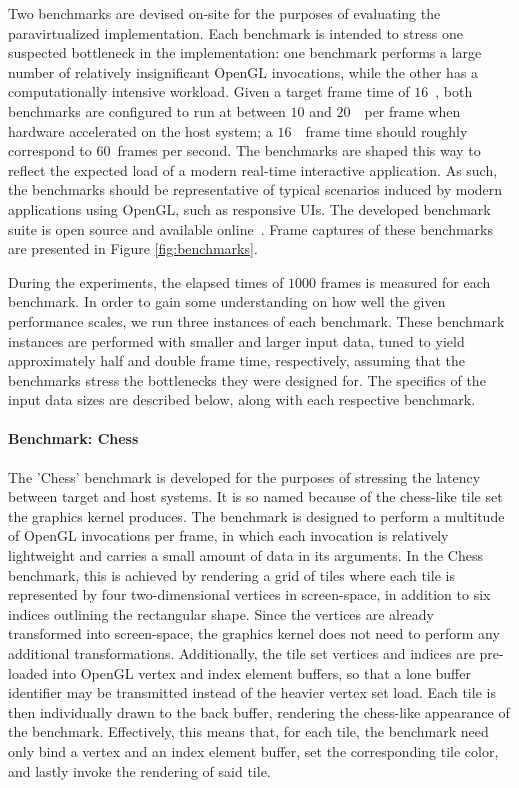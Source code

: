 \documentclass{article}
\newcommand{\masccite}[2][]{\cite{#2}}
\begin{document}
Two benchmarks are devised on-site for the purposes of evaluating the paravirtualized implementation.
Each benchmark is intended to stress one suspected bottleneck in the implementation: one benchmark performs a large number of relatively insignificant OpenGL invocations, while the other has a computationally intensive workload.
Given a target frame time of $16$~\milli\second , both benchmarks are configured to run at between $10$ and $20$~\milli\second\ per frame when hardware accelerated on the host system; a $16$~\milli\second\ frame time should roughly correspond to $60$~frames per second.
The benchmarks are shaped this way to reflect the expected load of a modern real-time interactive application.
As such, the benchmarks should be representative of typical scenarios induced by modern applications using OpenGL, such as responsive UIs.
The developed benchmark suite is open source and available online~\masccite{web:intel:2014}.
Frame captures of these benchmarks are presented in Figure \ref{fig:benchmarks}.

During the experiments, the elapsed times of $1000$ frames is measured for each benchmark.
In order to gain some understanding on how well the given performance scales, we run three instances of each benchmark.
These benchmark instances are performed with smaller and larger input data, tuned to yield approximately half and double frame time, respectively, assuming that the benchmarks stress the bottlenecks they were designed for.
The specifics of the input data sizes are described below, along with each respective benchmark.

\paragraph{Benchmark: Chess}
\label{par:experimentalmethodology_benchmarking_benchmarkchess}
The 'Chess' benchmark is developed for the purposes of stressing the latency between target and host systems.
It is so named because of the chess-like tile set the graphics kernel produces.
The benchmark is designed to perform a multitude of OpenGL invocations per frame, in which each invocation is relatively lightweight and carries a small amount of data in its arguments.
In the Chess benchmark, this is achieved by rendering a grid of tiles where each tile is represented by four two-dimensional vertices in screen-space, in addition to six indices outlining the rectangular shape.
Since the vertices are already transformed into screen-space, the graphics kernel does not need to perform any additional transformations.
Additionally, the tile set vertices and indices are pre-loaded into OpenGL vertex and index element buffers, so that a lone buffer identifier may be transmitted instead of the heavier vertex set load.
Each tile is then individually drawn to the back buffer, rendering the chess-like appearance of the benchmark.
Effectively, this means that, for each tile, the benchmark need only bind a vertex and an index element buffer, set the corresponding tile color, and lastly invoke the rendering of said tile.
\end{document}
